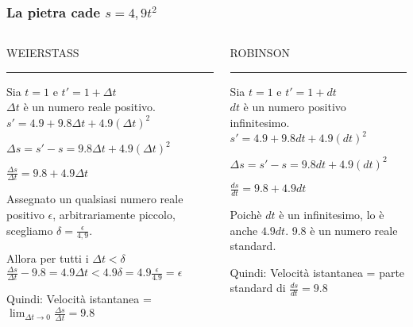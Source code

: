 \begin{frame}[label=Robinson]
  \frametitle{La pietra cade $s = 4,9t^2$ \cite{Davis}}
\begin{columns}[T] %
  \begin{column}{.48\textwidth}
    WEIERSTASS
  \color{red}\rule{\linewidth}{4pt}
  
  Sia $t=1$ e $t' = 1 + \Delta t$ \\
  $\Delta t$ è un numero reale positivo.\\
  $s' = 4.9 + 9.8 \Delta t + 4.9(\Delta t)^2$ \\
  \setlength{\parskip}{2em}

  $\Delta s = s' - s = 9.8 \Delta t + 4.9(\Delta t)^2$ \\
  \setlength{\parskip}{2em}

  $\frac{\Delta s}{\Delta t} = 9.8 + 4.9 \Delta t$ \\
  \setlength{\parskip}{3em}

  Assegnato un qualsiasi numero reale positivo $\epsilon$, arbitrariamente piccolo, scegliamo
  $\delta = \frac{\epsilon}{4,9}$. \\
  \setlength{\parskip}{4em}
  
  Allora per tutti i $\Delta t < \delta$ \\
  $\frac{\Delta s}{\Delta t} - 9.8 = 4.9 \Delta t < 4.9 \delta  = 4.9 \frac{\epsilon}{4.9} = \epsilon$\\
  \setlength{\parskip}{4em}

  Quindi: Velocità istantanea = $ \lim_{\Delta t \to 0} \frac{\Delta s}{\Delta t} = 9.8 $ 
  
  \end{column}%
  \hfill%
  \begin{column}{.48\textwidth}
    ROBINSON
  \color{blue}\rule{\linewidth}{4pt}
  
  Sia $t=1$ e $t' = 1 + dt$ \\
  $dt$ è un numero positivo infinitesimo.\\
  $s' = 4.9 + 9.8 dt + 4.9(dt)^2$ \\
  \setlength{\parskip}{2em}

  $\Delta s = s' - s = 9.8 dt + 4.9(dt)^2$ \\
  \setlength{\parskip}{2em}

  $\frac{ds}{dt} = 9.8 + 4.9 dt$ \\
  \setlength{\parskip}{3em}

  Poichè $dt$ è un infinitesimo, lo è anche $4.9dt$. 9.8 è un numero reale standard.
  \setlength{\parskip}{4em}
  
    Quindi: Velocità istantanea = parte standard di $\frac{ds}{dt} = 9.8$ 
  
  \end{column}%
  
  \end{columns}
\end{frame}